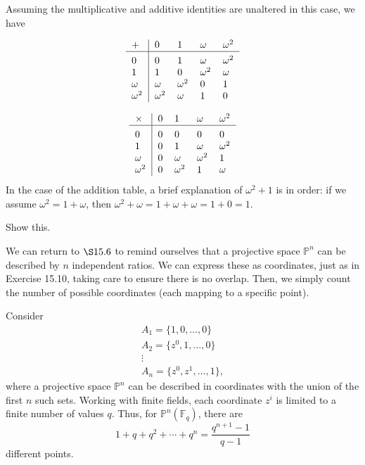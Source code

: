 \documentclass[../the-road-to-reality.tex]{subfiles}
\begin{document}
\begin{questions}
	\begin{solution}
		Assuming the multiplicative and additive identities are unaltered in this case, we have

		\[
			\begin{tabular}{>{$}l<{$}|*{4}{>{$}l<{$}}}
				+  & 0  & 1 & \omega & \omega^2 \\
				\hline\vrule height 12pt width 0pt
				0  & 0  & 1 & \omega & \omega^2 \\
				1 & 1 & 0  & \omega^2  &  \omega \\
				\omega  & \omega  & \omega^2 & 0  & 1 \\
				\omega^2 & \omega^2 & \omega & 1 & 0  \\
			\end{tabular} 
		\]

		\[
			\begin{tabular}{>{$}l<{$}|*{4}{>{$}l<{$}}}
				\times  & 0  & 1 & \omega & \omega^2 \\
				\hline\vrule height 12pt width 0pt
				0  & 0  & 0 & 0 & 0 \\
				1 & 0 & 1  & \omega  &  \omega^2 \\
				\omega  & 0 & \omega & \omega^2 & 1 \\
				\omega^2 & 0 & \omega^2 & 1 & \omega \\
			\end{tabular} 
		\]
		In the case of the addition table, a brief explanation of $\omega^2 + 1$
		is in order: if we assume $\omega^2 = 1 +
		\omega$, then $\omega^2 + \omega = 1 + \omega + \omega = 1 + 0 = 1$.
	\end{solution}

	\question Show this.

	\begin{solution}
		We can return to $\S15.6$ to remind ourselves that a projective space
		$\mathbb{P}^n$ can be described by $n$ independent ratios. We can express these
		as coordinates, just as in Exercise 15.10, taking care to ensure there is no
		overlap. Then, we simply count the number of possible coordinates (each
		mapping to a specific point).

		Consider
		\begin{gather*}
			A_1 = \{1,0,\dots,0\} \\
			A_2 = \{z^0, 1, \dots, 0\} \\
			\vdots \\
			A_n = \{z^0, z^1, \dots, 1\},
		\end{gather*}
		where a projective space $\mathbb{P}^n$ can be described in coordinates with the union of the
		first $n$ such sets. Working with finite fields, each coordinate $z^i$ is
		limited to a finite number of values $q$. Thus, for
		$\mathbb{P}^n(\mathbb{F}_q)$, there are
		\[
			1 + q + q^2 + \cdots + q^n = \frac{q^{n+1} - 1}{q - 1}
		\]
		different points.
	\end{solution}


\end{questions}
\end{document}
